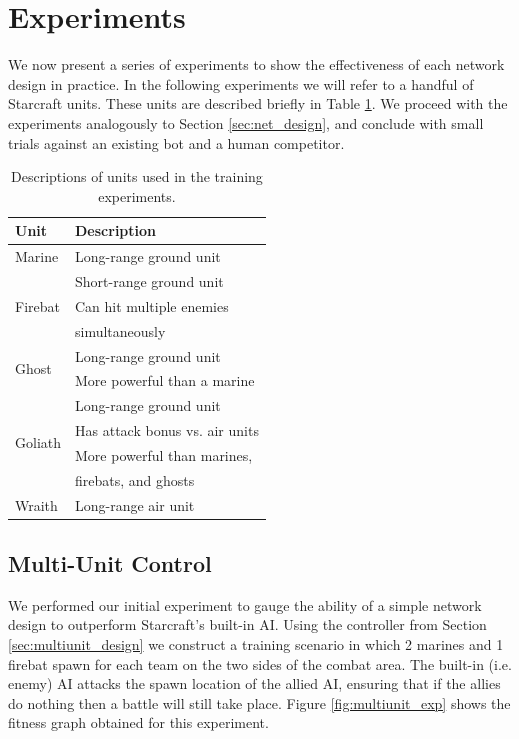 \documentclass[10pt,a4paper,twocolumn]{article}
\begin{document}
\section{Experiments}
\label{sec:exp}

We now present a series of experiments to show the effectiveness of each network design in practice. In the following experiments we will refer to a handful of Starcraft units. These units are described briefly in Table \ref{tab:units}. We proceed with the experiments analogously to Section \ref{sec:net_design}, and conclude with small trials against an existing bot and a human competitor.

\begin{table}
\centering
\begin{tabular}{|l|l|}
	\hline
	{\bf Unit} & {\bf Description} \\ \hline
	Marine & Long-range ground unit \\ \hline
	\multirow{3}{*}{Firebat} & Short-range ground unit \\
	& Can hit multiple enemies \\
	& simultaneously \\ \hline
	\multirow{2}{*}{Ghost} & Long-range ground unit \\
	& More powerful than a marine\\ \hline
	\multirow{4}{*}{Goliath} & Long-range ground unit \\
	& Has attack bonus vs. air units \\
	& More powerful than marines, \\
	& firebats, and ghosts \\ \hline
	Wraith & Long-range air unit \\ \hline
\end{tabular}
\caption{Descriptions of units used in the training experiments.}
\label{tab:units}
\end{table}
	
\subsection{Multi-Unit Control}
\label{sec:multiunit_exp}

We performed our initial experiment to gauge the ability of a simple network design to outperform Starcraft's built-in AI. Using the controller from Section \ref{sec:multiunit_design} we construct a training scenario in which 2 marines and 1 firebat spawn for each team on the two sides of the combat area. The built-in (i.e. enemy) AI attacks the spawn location of the allied AI, ensuring that if the allies do nothing then a battle will still take place. Figure \ref{fig:multiunit_exp} shows the fitness graph obtained for this experiment.
\end{document}
